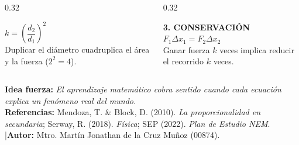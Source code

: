 \documentclass[aspectratio=169,xcolor={dvipsnames,table}]{beamer}
\begin{document}
\begin{frame}[plain]
\begin{columns}[T,onlytextwidth]
\begin{column}{0.32\textwidth}
\begin{tcolorbox}[enhanced,colback=visNavyMid,colframe=visAmber,boxrule=1.2pt,arc=4pt,left=6pt,right=6pt,top=6pt,bottom=6pt,height=2.85cm]
        {\color{white}\large $k = \left(\dfrac{d_2}{d_1}\right)^2$}\\[0.15cm]
        {\color{white!80!visPaper}\tiny Duplicar el diámetro cuadruplica el área y la fuerza ($2^2 = 4$).}
      \end{tcolorbox}
    \end{column}
    \begin{column}{0.32\textwidth}
      \begin{tcolorbox}[enhanced,colback=visNavyMid,colframe=visTeal,boxrule=1.2pt,arc=4pt,left=6pt,right=6pt,top=6pt,bottom=6pt,height=2.85cm]
        \centering
        {\color{visTeal!40!white}\scriptsize\bfseries 3. CONSERVACIÓN}\\[0.15cm]
        {\color{white}\large $F_1 \Delta x_1 = F_2 \Delta x_2$}\\[0.15cm]
        {\color{white!80!visPaper}\tiny Ganar fuerza $k$ veces implica reducir el recorrido $k$ veces.}
      \end{tcolorbox}
    \end{column}
  \end{columns}
  \vspace{0.18cm}
  \begin{tcolorbox}[enhanced,colback=white!10!visNavy,colframe=visSteelDark,boxrule=0.8pt,arc=4pt,left=8pt,right=8pt,top=4pt,bottom=4pt]
    \color{white}\scriptsize
    \textbf{Idea fuerza:} \textit{El aprendizaje matemático cobra sentido cuando cada ecuación explica un fenómeno real del mundo.}\\[2pt]
    \color{visFluidLight}\tiny \textbf{Referencias:} Mendoza, T. \& Block, D. (2010). \textit{La proporcionalidad en secundaria}; Serway, R. (2018). \textit{Física}; SEP (2022). \textit{Plan de Estudio NEM}. \quad|\quad \textbf{Autor:} Mtro. Martín Jonathan de la Cruz Muñoz (00874).
  \end{tcolorbox}
\end{frame}
\end{document}
